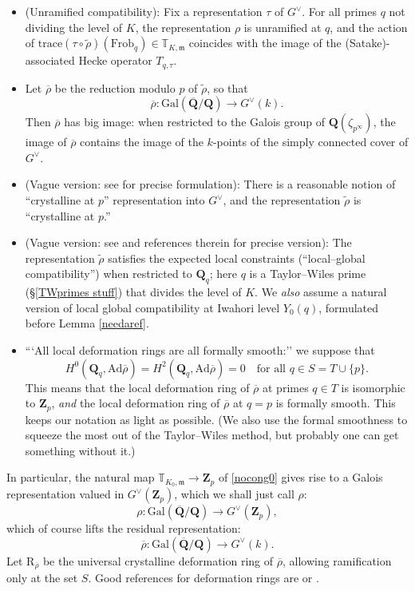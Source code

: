 \documentclass[10pt]{amsart}
\newcommand{\Z}{\mathbf{Z}}
\newcommand{\Gal}{\mathrm{Gal}}
\newcommand{\defring}{\mathrm{R}_{\rhobar}}
\newcommand{\Ad}{\mathrm{Ad}}
\newcommand{\rhobar}{\overline{\rho}}
\newcommand{\Q}{\mathbf{Q}}
\newcommand{\ramprimes}{S}
\theoremstyle{remark}
\begin{document}
\begin{itemize}
\item[(a)]
(Unramified compatibility): Fix a representation $\tau$ of $G^{\vee}$.
For all primes $q$ not dividing the level of $K$, 
the representation $\rho$ is unramified at $q$, and  the action of $\mathrm{trace}(\tau \circ \tilde{\rho})(\mathrm{Frob}_q) \in   \mathbb{T}_{K, \mathfrak{m}}$
coincides with the image of  the (Satake)-associated Hecke operator 
$T_{q, \tau}$.

  
 \item[(b)]  Let $\rhobar$ be the reduction modulo $p$ of $\tilde{\rho}$, so that
$$\rhobar: \Gal(\overline{\Q}/\Q) \rightarrow G^{\vee}(k).$$ 
 Then $\rhobar$ has big image:  when restricted to the Galois
 group of $\Q(\zeta_{p^{\infty}})$, 
 the image of $\rhobar$   contains the image of the $k$-points of the simply connected cover of $G^{\vee}$.
 
 \item[(c)] (Vague version: see \cite[Conjecture 6.1]{GV} for precise formulation): There is a reasonable notion of ``crystalline at $p$'' representation into $G^{\vee}$,
 and the representation $\tilde{\rho}$ is ``crystalline at $p$.'' 
 
 \item[(d)] (Vague version: see \cite[Conjecture 6.1]{GV} and references therein for precise version): The representation
 $\tilde{\rho}$ satisfies the expected local constraints (``local--global compatibility'') when restricted to $\Q_{q}$; 
 here $q$ is a Taylor--Wiles prime (\S \ref{TWprimes stuff}) that divides the level of $K$.  We {\em also} assume a natural version of local global compatibility
 at Iwahori level $Y_0(q)$, formulated  before  Lemma \ref{needaref}. 
 
 \item[(e)] ```All local deformation rings are all formally smooth:''   we suppose that   $$H^0(\Q_q, \Ad \rhobar) = H^2(\Q_q, \Ad \rhobar)=0 \ \ \ \mbox{ for all } q \in \ramprimes = T \cup \{p\}.$$
This means that the local deformation ring of $\rhobar$ at primes $q \in T$  is isomorphic to $\Z_p$,
{\em and} the  local deformation ring of $\rhobar$ at $q=p$ is formally smooth.  This keeps our notation as light as possible. (We also use the formal smoothness
to squeeze the most out of the Taylor--Wiles method, but 
probably one can get something without it.)
 \end{itemize}
 
 In particular, the natural map $\mathbb{T}_{K_0,\mathfrak{m}} \rightarrow \Z_p$  of \eqref{nocong0} gives rise to a Galois representation
 valued in $G^{\vee}(\Z_p)$, which we shall just call $\rho$: \index{$\rho$} 
\begin{equation} \label{Zplift} \rho: \Gal(\overline{\Q}/\Q) \longrightarrow G^{\vee}(\Z_p),\end{equation}
 which of course lifts the residual representation:
 $$\rhobar: \Gal(\overline{\Q}/\Q) \longrightarrow G^{\vee}(k).$$ \index{$\rhobar$} 
 \index{$\defring$} 
 Let $\defring$ be the universal  crystalline deformation ring of $\rhobar$, allowing ramification only at the set $\ramprimes$.    
Good references for deformation rings  are \cite{CHT} 
or \cite{AWS}.
 
\end{document}
